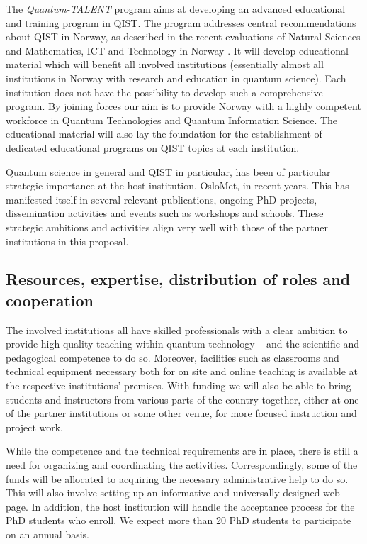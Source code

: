 \documentclass{scrreprt}
\begin{document}
The \textit{Quantum-TALENT} program aims at developing an advanced educational and training program in QIST. The program addresses central recommendations about QIST in Norway, as described in the recent evaluations of Natural Sciences and Mathematics, ICT and Technology in Norway \cite{evalnat,evalmat}. 
It will develop educational material which will benefit all involved institutions (essentially almost all  institutions in Norway with research and education in quantum science). Each institution does not have the possibility to develop such a comprehensive program. By joining forces our aim is to provide Norway with a highly competent workforce in Quantum Technologies and Quantum Information Science.  The educational material will also lay the foundation for the establishment of dedicated educational programs on QIST topics at each institution.

Quantum science in general and QIST in particular, has been of particular strategic importance at the host institution, OsloMet, in recent years. This has manifested itself in several relevant publications, ongoing PhD projects, dissemination activities and events such as workshops and schools. These strategic ambitions and activities align very well with those of the partner institutions in this proposal.

\subsection{Resources, expertise, distribution of roles and cooperation}

The involved institutions all have skilled professionals with a clear ambition to provide high quality teaching within quantum technology -- and the scientific and pedagogical competence to do so. Moreover, facilities such as classrooms and technical equipment necessary both for on site and online teaching is available at the respective institutions' premises. With funding we will also be able to bring students and instructors from various parts of the country together, either at one of the partner institutions or some other venue, for more focused instruction and project work.

While the competence and the technical requirements are in place, there is still a need for organizing and coordinating the activities. Correspondingly, some of the funds will be allocated to acquiring the necessary administrative help to do so. This will also involve setting up an informative and universally designed web page. In addition, the host institution will handle the acceptance process for the PhD students who enroll. We expect more than 20 PhD students to participate on an annual basis.
\end{document}
